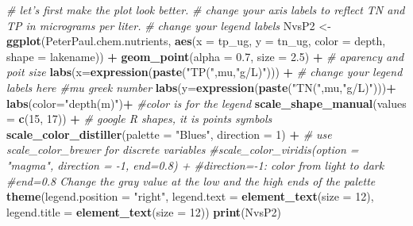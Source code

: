 \documentclass[]{article}
\newenvironment{Shaded}{\begin{snugshade}}{\end{snugshade}}
\newcommand{\CommentTok}[1]{\textcolor[rgb]{0.56,0.35,0.01}{\textit{#1}}}
\newcommand{\DataTypeTok}[1]{\textcolor[rgb]{0.13,0.29,0.53}{#1}}
\newcommand{\DecValTok}[1]{\textcolor[rgb]{0.00,0.00,0.81}{#1}}
\newcommand{\FloatTok}[1]{\textcolor[rgb]{0.00,0.00,0.81}{#1}}
\newcommand{\KeywordTok}[1]{\textcolor[rgb]{0.13,0.29,0.53}{\textbf{#1}}}
\newcommand{\NormalTok}[1]{#1}
\newcommand{\OperatorTok}[1]{\textcolor[rgb]{0.81,0.36,0.00}{\textbf{#1}}}
\newcommand{\StringTok}[1]{\textcolor[rgb]{0.31,0.60,0.02}{#1}}
\begin{document}
\begin{Shaded}
\begin{Highlighting}[]
\CommentTok{# let's first make the plot look better.}
\CommentTok{# change your axis labels to reflect TN and TP in micrograms per liter.}
\CommentTok{# change your legend labels}
\NormalTok{NvsP2 <-}
\StringTok{  }\KeywordTok{ggplot}\NormalTok{(PeterPaul.chem.nutrients, }\KeywordTok{aes}\NormalTok{(}\DataTypeTok{x =}\NormalTok{ tp_ug, }\DataTypeTok{y =}\NormalTok{ tn_ug, }\DataTypeTok{color =}\NormalTok{ depth, }\DataTypeTok{shape =}\NormalTok{ lakename)) }\OperatorTok{+}
\StringTok{  }\KeywordTok{geom_point}\NormalTok{(}\DataTypeTok{alpha =} \FloatTok{0.7}\NormalTok{, }\DataTypeTok{size =} \FloatTok{2.5}\NormalTok{) }\OperatorTok{+}\StringTok{  }\CommentTok{# aparency and poit size}
\StringTok{  }\KeywordTok{labs}\NormalTok{(}\DataTypeTok{x=}\KeywordTok{expression}\NormalTok{(}\KeywordTok{paste}\NormalTok{(}\StringTok{"TP("}\NormalTok{,mu,}\StringTok{"g/L)"}\NormalTok{))) }\OperatorTok{+}\StringTok{ }\CommentTok{# change your legend labels here #mu greek number}
\StringTok{  }\KeywordTok{labs}\NormalTok{(}\DataTypeTok{y=}\KeywordTok{expression}\NormalTok{(}\KeywordTok{paste}\NormalTok{(}\StringTok{"TN("}\NormalTok{,mu,}\StringTok{"g/L)"}\NormalTok{)))}\OperatorTok{+}
\StringTok{  }\KeywordTok{labs}\NormalTok{(}\DataTypeTok{color=}\StringTok{"depth(m)"}\NormalTok{)}\OperatorTok{+}\StringTok{ }\CommentTok{#color is for the legend}
\StringTok{  }\KeywordTok{scale_shape_manual}\NormalTok{(}\DataTypeTok{values =} \KeywordTok{c}\NormalTok{(}\DecValTok{15}\NormalTok{, }\DecValTok{17}\NormalTok{)) }\OperatorTok{+}\StringTok{  }\CommentTok{# google R shapes, it is  points symbols }
\StringTok{  }\KeywordTok{scale_color_distiller}\NormalTok{(}\DataTypeTok{palette =} \StringTok{"Blues"}\NormalTok{, }\DataTypeTok{direction =} \DecValTok{1}\NormalTok{) }\OperatorTok{+}\StringTok{ }\CommentTok{# use scale_color_brewer for discrete variables}
\StringTok{  }\CommentTok{#scale_color_viridis(option = "magma", direction = -1, end=0.8) + #direction=-1: color from light to dark}
\StringTok{                                                                   }\CommentTok{#end=0.8 Change the gray value at the low and the high ends of the palette}
\StringTok{  }\KeywordTok{theme}\NormalTok{(}\DataTypeTok{legend.position =} \StringTok{"right"}\NormalTok{, }
        \DataTypeTok{legend.text =} \KeywordTok{element_text}\NormalTok{(}\DataTypeTok{size =} \DecValTok{12}\NormalTok{), }\DataTypeTok{legend.title =} \KeywordTok{element_text}\NormalTok{(}\DataTypeTok{size =} \DecValTok{12}\NormalTok{))}
\KeywordTok{print}\NormalTok{(NvsP2)}
\end{Highlighting}
\end{Shaded}
\end{document}
